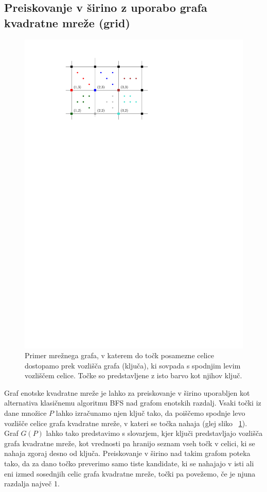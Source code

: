\documentclass[a4paper, 12pt]{book}
\begin{document}

\subsection{Preiskovanje v širino z uporabo grafa kvadratne mreže (grid)}
\begin{figure}
\centerline{\includegraphics[scale=1.2]{pics/grid.pdf}}
\caption{Primer mrežnega grafa, v katerem do točk posamezne celice dostopamo prek vozlišča grafa (ključa), ki sovpada s spodnjim levim vozliščem celice. Točke so predstavljene z isto barvo kot njihov ključ.}
\label{grid-fig}
\end{figure}

Graf enotske kvadratne mreže je lahko za preiskovanje v širino uporabljen kot alternativa klasičnemu algoritmu BFS nad grafom enotskih razdalj. Vsaki točki iz dane množice $P$ lahko izračunamo njen ključ tako, da poiščemo spodnje levo vozlišče celice grafa kvadratne mreže, v kateri se točka nahaja (glej sliko ~\ref{grid-fig}). Graf $G(P)$ lahko tako predstavimo s slovarjem, kjer ključi predstavljajo vozlišča grafa kvadratne mreže, kot vrednosti pa hranijo seznam vseh točk v celici, ki se nahaja zgoraj desno od ključa. Preiskovanje v širino nad takim grafom poteka tako, da za dano točko preverimo samo tiste kandidate, ki se nahajajo v isti ali eni izmed sosednjih celic grafa kvadratne mreže, točki pa povežemo, če je njuna razdalja največ 1.
\end{document}
